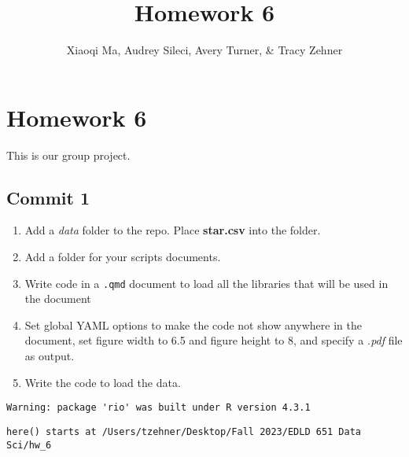\documentclass[
  letterpaper,
  DIV=11,
  numbers=noendperiod]{scrartcl}
\title{Homework 6}
\author{Xiaoqi Ma, Audrey Sileci, Avery Turner, \& Tracy Zehner}
\date{}
\begin{document}
\maketitle
\ifdefined\Shaded\renewenvironment{Shaded}{\begin{tcolorbox}[sharp corners, borderline west={3pt}{0pt}{shadecolor}, boxrule=0pt, enhanced, frame hidden, interior hidden, breakable]}{\end{tcolorbox}}\fi

\hypertarget{homework-6}{%
\section{Homework 6}\label{homework-6}}

This is our group project.

\hypertarget{commit-1}{%
\subsection{Commit 1}\label{commit-1}}

\begin{enumerate}
\def\labelenumi{\arabic{enumi}.}
\item
  Add a \emph{data} folder to the repo. Place \textbf{star.csv} into the
  folder.
\item
  Add a folder for your scripts documents.
\item
  Write code in a \texttt{.qmd} document to load all the libraries that
  will be used in the document
\item
  Set global YAML options to make the code not show anywhere in the
  document, set figure width to 6.5 and figure height to 8, and specify
  a \emph{.pdf} file as output.
\item
  Write the code to load the data.
\end{enumerate}

\begin{verbatim}
Warning: package 'rio' was built under R version 4.3.1
\end{verbatim}

\begin{verbatim}
here() starts at /Users/tzehner/Desktop/Fall 2023/EDLD 651 Data Sci/hw_6
\end{verbatim}
\end{document}
